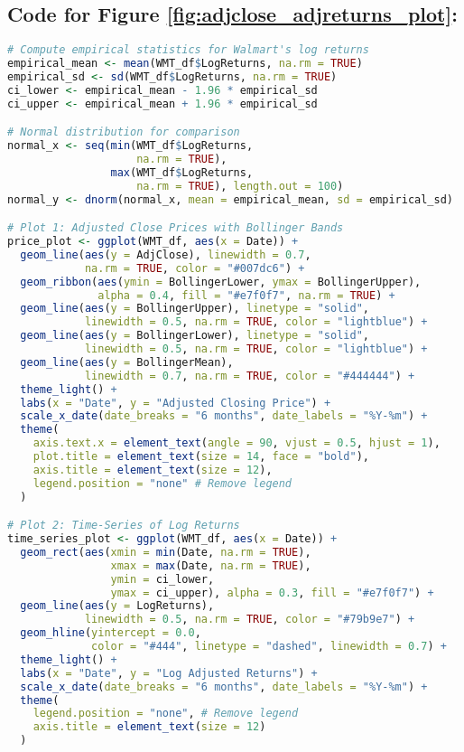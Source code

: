 \documentclass{article}
\newcommand{\1}{\mathbbm{1}}
\theoremstyle{definition}
\begin{document}
\subsection{Code for Figure \ref{fig:adjclose_adjreturns_plot}:}
\label{subsec:adjclose_adjreturns_plot}

\begin{lstlisting}[language=R]
# Compute empirical statistics for Walmart's log returns
empirical_mean <- mean(WMT_df$LogReturns, na.rm = TRUE)
empirical_sd <- sd(WMT_df$LogReturns, na.rm = TRUE)
ci_lower <- empirical_mean - 1.96 * empirical_sd
ci_upper <- empirical_mean + 1.96 * empirical_sd

# Normal distribution for comparison
normal_x <- seq(min(WMT_df$LogReturns,
                    na.rm = TRUE), 
                max(WMT_df$LogReturns, 
                    na.rm = TRUE), length.out = 100)
normal_y <- dnorm(normal_x, mean = empirical_mean, sd = empirical_sd)

# Plot 1: Adjusted Close Prices with Bollinger Bands
price_plot <- ggplot(WMT_df, aes(x = Date)) +
  geom_line(aes(y = AdjClose), linewidth = 0.7, 
            na.rm = TRUE, color = "#007dc6") +
  geom_ribbon(aes(ymin = BollingerLower, ymax = BollingerUpper), 
              alpha = 0.4, fill = "#e7f0f7", na.rm = TRUE) +
  geom_line(aes(y = BollingerUpper), linetype = "solid", 
            linewidth = 0.5, na.rm = TRUE, color = "lightblue") +
  geom_line(aes(y = BollingerLower), linetype = "solid", 
            linewidth = 0.5, na.rm = TRUE, color = "lightblue") +
  geom_line(aes(y = BollingerMean), 
            linewidth = 0.7, na.rm = TRUE, color = "#444444") +
  theme_light() +
  labs(x = "Date", y = "Adjusted Closing Price") +
  scale_x_date(date_breaks = "6 months", date_labels = "%Y-%m") +
  theme(
    axis.text.x = element_text(angle = 90, vjust = 0.5, hjust = 1),
    plot.title = element_text(size = 14, face = "bold"),
    axis.title = element_text(size = 12),
    legend.position = "none" # Remove legend
  )

# Plot 2: Time-Series of Log Returns
time_series_plot <- ggplot(WMT_df, aes(x = Date)) +
  geom_rect(aes(xmin = min(Date, na.rm = TRUE), 
                xmax = max(Date, na.rm = TRUE), 
                ymin = ci_lower, 
                ymax = ci_upper), alpha = 0.3, fill = "#e7f0f7") +
  geom_line(aes(y = LogReturns), 
            linewidth = 0.5, na.rm = TRUE, color = "#79b9e7") +
  geom_hline(yintercept = 0.0, 
             color = "#444", linetype = "dashed", linewidth = 0.7) +
  theme_light() +
  labs(x = "Date", y = "Log Adjusted Returns") +
  scale_x_date(date_breaks = "6 months", date_labels = "%Y-%m") +
  theme(
    legend.position = "none", # Remove legend
    axis.title = element_text(size = 12)
  )


\end{lstlisting}
\end{document}
